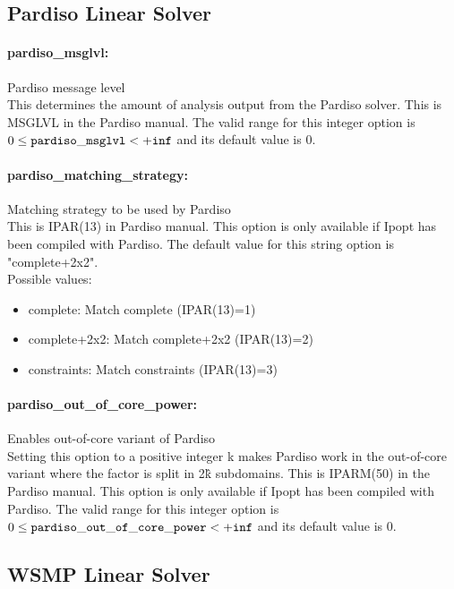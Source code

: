\subsection{Pardiso Linear Solver}

\paragraph{pardiso\_msglvl:}\label{sec:pardiso_msglvl} Pardiso message level $\;$ \\
 This determines the amount of analysis output
from the Pardiso solver. This is MSGLVL in the
Pardiso manual. The valid range for this integer option is
$0 \le {\tt pardiso\_msglvl } <  {\tt +inf}$
and its default value is $0$.


\paragraph{pardiso\_matching\_strategy:}\label{sec:pardiso_matching_strategy} Matching strategy to be used by Pardiso $\;$ \\
 This is IPAR(13) in Pardiso manual.  This option
is only available if Ipopt has been compiled with
Pardiso.
The default value for this string option is "complete+2x2".
\\ 
Possible values:
\begin{itemize}
   \item complete: Match complete (IPAR(13)=1)
   \item complete+2x2: Match complete+2x2 (IPAR(13)=2)
   \item constraints: Match constraints (IPAR(13)=3)
\end{itemize}

\paragraph{pardiso\_out\_of\_core\_power:}\label{sec:pardiso_out_of_core_power} Enables out-of-core variant of Pardiso $\;$ \\
 Setting this option to a positive integer k makes
Pardiso work in the out-of-core variant where the
factor is split in 2\^k subdomains.  This is
IPARM(50) in the Pardiso manual.  This option is
only available if Ipopt has been compiled with
Pardiso. The valid range for this integer option is
$0 \le {\tt pardiso\_out\_of\_core\_power } <  {\tt +inf}$
and its default value is $0$.


\subsection{WSMP Linear Solver}


